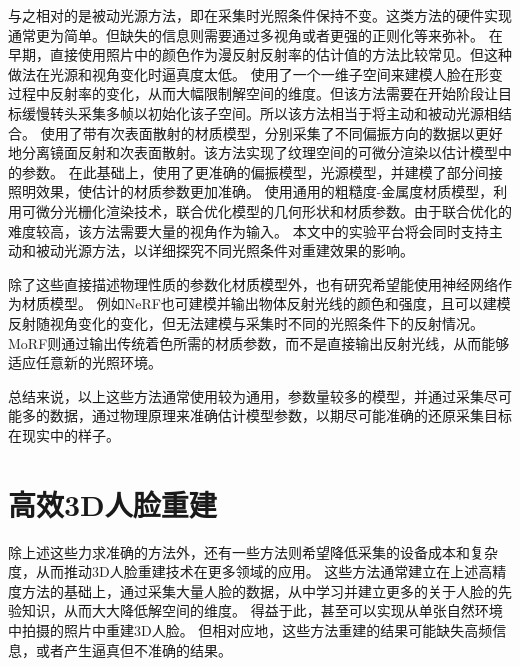 与之相对的是被动光源方法，即在采集时光照条件保持不变。这类方法的硬件实现通常更为简单。但缺失的信息则需要通过多视角或者更强的正则化等来弥补。
在早期，直接使用照片中的颜色作为漫反射反射率的估计值的方法\citep{PighinHLSS98,BradleyHPS10}比较常见。但这种做法在光源和视角变化时逼真度太低。
\citet{GotardoRBGB18}使用了一个一维子空间来建模人脸在形变过程中反射率的变化，从而大幅限制解空间的维度。但该方法需要在开始阶段让目标缓慢转头采集多帧以初始化该子空间。所以该方法相当于将主动和被动光源相结合。
\citet{RiviereGBGB20}使用了带有次表面散射的材质模型，分别采集了不同偏振方向的数据以更好地分离镜面反射和次表面散射。该方法实现了纹理空间的可微分渲染以估计模型中的参数。
在此基础上，\citet{XuRZCBG22}使用了更准确的偏振模型，光源模型，并建模了部分间接照明效果，使估计的材质参数更加准确。
\citet{nvdiffrec}使用通用的粗糙度-金属度材质模型，利用可微分光栅化渲染技术，联合优化模型的几何形状和材质参数。由于联合优化的难度较高，该方法需要大量的视角作为输入。
本文中的实验平台将会同时支持主动和被动光源方法，以详细探究不同光照条件对重建效果的影响。

除了这些直接描述物理性质的参数化材质模型外，也有研究希望能使用神经网络作为材质模型。
例如NeRF\citep{nerf}也可建模并输出物体反射光线的颜色和强度，且可以建模反射随视角变化的变化，但无法建模与采集时不同的光照条件下的反射情况。
MoRF\citep{MoRF}则通过输出传统着色所需的材质参数，而不是直接输出反射光线，从而能够适应任意新的光照环境。

总结来说，以上这些方法通常使用较为通用，参数量较多的模型，并通过采集尽可能多的数据，通过物理原理来准确估计模型参数，以期尽可能准确的还原采集目标在现实中的样子。

\section{高效3D人脸重建}

除上述这些力求准确的方法外，还有一些方法则希望降低采集的设备成本和复杂度，从而推动3D人脸重建技术在更多领域的应用。
这些方法通常建立在上述高精度方法的基础上，通过采集大量人脸的数据，从中学习并建立更多的关于人脸的先验知识，从而大大降低解空间的维度。
得益于此，甚至可以实现从单张自然环境中拍摄的照片中重建3D人脸。
但相对应地，这些方法重建的结果可能缺失高频信息，或者产生逼真但不准确的结果。

